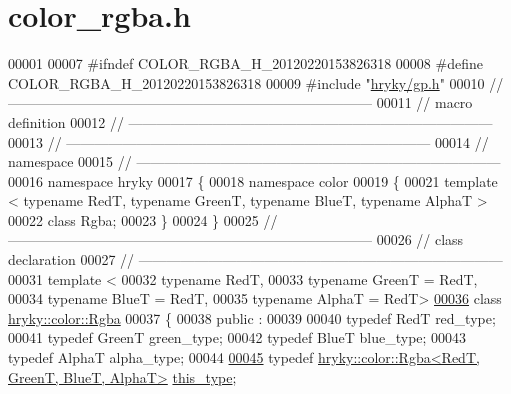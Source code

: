 \hypertarget{color__rgba_8h_source}{\section{color\-\_\-rgba.\-h}
}

\begin{DoxyCode}
00001 
00007 \textcolor{preprocessor}{#ifndef COLOR\_RGBA\_H\_20120220153826318}
00008 \textcolor{preprocessor}{}\textcolor{preprocessor}{#define COLOR\_RGBA\_H\_20120220153826318}
00009 \textcolor{preprocessor}{}\textcolor{preprocessor}{#include "\hyperlink{gp_8h}{hryky/gp.h}"}
00010 \textcolor{comment}{//
      ------------------------------------------------------------------------------}
00011 \textcolor{comment}{// macro definition}
00012 \textcolor{comment}{//
      ------------------------------------------------------------------------------}
00013 \textcolor{comment}{//
      ------------------------------------------------------------------------------}
00014 \textcolor{comment}{// namespace}
00015 \textcolor{comment}{//
      ------------------------------------------------------------------------------}
00016 \textcolor{keyword}{namespace }hryky
00017 \{
00018 \textcolor{keyword}{namespace }color
00019 \{
00021     \textcolor{keyword}{template} < \textcolor{keyword}{typename} RedT, \textcolor{keyword}{typename} GreenT, \textcolor{keyword}{typename} BlueT, \textcolor{keyword}{typename} AlphaT 
      >
00022     \textcolor{keyword}{class }Rgba;
00023 \}
00024 \}
00025 \textcolor{comment}{//
      ------------------------------------------------------------------------------}
00026 \textcolor{comment}{// class declaration}
00027 \textcolor{comment}{//
      ------------------------------------------------------------------------------}
00031 \textcolor{comment}{}\textcolor{keyword}{template} <
00032     \textcolor{keyword}{typename} RedT,
00033     \textcolor{keyword}{typename} GreenT = RedT,
00034     \textcolor{keyword}{typename} BlueT = RedT,
00035     \textcolor{keyword}{typename} AlphaT = RedT>
\hypertarget{color__rgba_8h_source_l00036}{}\hyperlink{classhryky_1_1color_1_1_rgba}{00036} \textcolor{keyword}{class }\hyperlink{classhryky_1_1color_1_1_rgba}{hryky::color::Rgba}
00037 \{
00038 \textcolor{keyword}{public} :
00039 
00040     \textcolor{keyword}{typedef} RedT    red\_type;
00041     \textcolor{keyword}{typedef} GreenT  green\_type;
00042     \textcolor{keyword}{typedef} BlueT   blue\_type;
00043     \textcolor{keyword}{typedef} AlphaT  alpha\_type;
00044 
\hypertarget{color__rgba_8h_source_l00045}{}\hyperlink{classhryky_1_1color_1_1_rgba_a6ffc48e44b20a791c6bd35bf637a54ad}{00045}     \textcolor{keyword}{typedef} \hyperlink{classhryky_1_1color_1_1_rgba}{hryky::color::Rgba<RedT, GreenT, BlueT, AlphaT>} \hyperlink{classhryky_1_1color_1_1_rgba_a6ffc48e44b20a791c6bd35bf637a54ad}{this_type};

\end{DoxyCode}
